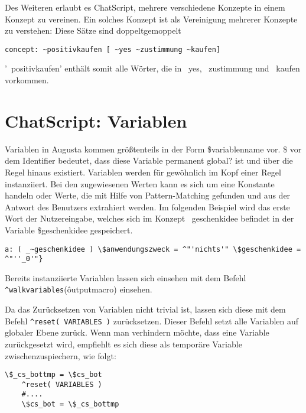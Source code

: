 \textcolor[rgb]{1,0.41,0.13}{Des Weiteren erlaubt es ChatScript, mehrere verschiedene Konzepte in einem Konzept zu vereinen. Ein solches Konzept ist als Vereinigung mehrerer Konzepte zu verstehen: Diese Sätze sind doppeltgemoppelt}

\begin{lstlisting}[caption={Konzept 'positivkaufen' aus konzepte.top}]
concept: ~positivkaufen [ ~yes ~zustimmung ~kaufen]
\end{lstlisting}

'~positivkaufen' enthält somit alle Wörter, die in ~yes, ~zustimmung und ~kaufen vorkommen. 

\section{ChatScript: Variablen}
\label{sec:ChatScript: Variablen}
Variablen in Augusta kommen größtenteils in der Form \$variablenname vor. \$ vor dem Identifier bedeutet, dass diese Variable permanent \textcolor[rgb]{1,0.41,0.13}{global?} ist und über die Regel hinaus existiert. Variablen werden für gewöhnlich im Kopf einer Regel instanziiert. Bei den zugewiesenen Werten kann es sich um eine Konstante handeln oder Werte, die mit Hilfe von Pattern-Matching gefunden und aus der Antwort des Benutzers extrahiert werden. Im folgenden Beispiel wird das erste Wort der Nutzereingabe, welches sich im Konzept ~geschenkidee befindet in der Variable \$geschenkidee gespeichert. 

\begin{lstlisting}[caption={Zuweisung des Wertes einer Variable }]
a: ( _~geschenkidee ) \$anwendungszweck = ^"'nichts'" \$geschenkidee = ^"''_0'"}
\end{lstlisting}

Bereits instanziierte Variablen lassen sich einsehen mit dem Befehl \lstinline|^walkvariables|(\^outputmacro) einsehen. 

Da das Zurücksetzen von Variablen nicht trivial ist, lassen sich diese mit dem Befehl \lstinline|^reset( VARIABLES )| zurücksetzen. Dieser Befehl setzt alle Variablen auf globaler Ebene zurück. Wenn man verhindern möchte, dass eine Variable zurückgesetzt wird, empfiehlt es sich diese als temporäre Variable zwischenzuspiechern, wie folgt:


\begin{lstlisting}[caption={Zwischenspeichern einer Variable}]
	\$_cs_bottmp = \$cs_bot
    ^reset( VARIABLES )
    #....
	\$cs_bot = \$_cs_bottmp 
\end{lstlisting}

